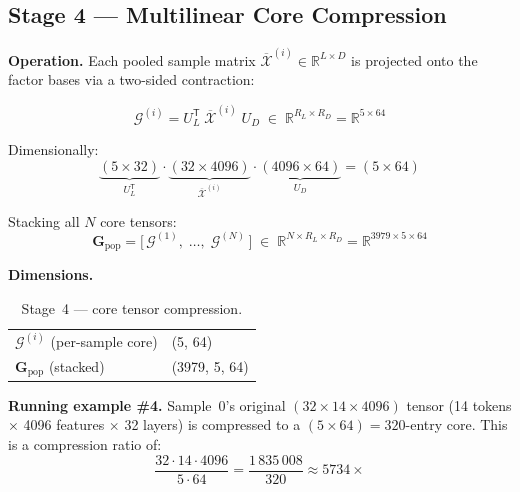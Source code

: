 \documentclass[11pt,a4paper]{article}
\begin{document}
\subsection{Stage 4 — Multilinear Core Compression}

\textbf{Operation.}
Each pooled sample matrix $\overline{\mathcal{X}}^{(i)} \in \mathbb{R}^{L \times D}$
is projected onto the factor bases via a two-sided contraction:

\[
\mathcal{G}^{(i)} = U_L^{\mathsf{T}} \;
                    \overline{\mathcal{X}}^{(i)} \;
                    U_D
                  \;\in\; \mathbb{R}^{R_L \times R_D}
                  = \mathbb{R}^{5 \times 64}
\]

Dimensionally:
\[
\underbrace{(5 \times 32)}_{U_L^{\mathsf{T}}}
\cdot
\underbrace{(32 \times 4096)}_{\overline{\mathcal{X}}^{(i)}}
\cdot
\underbrace{(4096 \times 64)}_{U_D}
=
(5 \times 64)
\]

Stacking all $N$ core tensors:
\[
\mathbf{G}_{\text{pop}} = \bigl[\,\mathcal{G}^{(1)},\; \dots,\;
                            \mathcal{G}^{(N)}\,\bigr]
                        \;\in\; \mathbb{R}^{N \times R_L \times R_D}
                        = \mathbb{R}^{3979 \times 5 \times 64}
\]

\noindent
\textbf{Dimensions.}

\begin{table}[H]
\centering
\begin{tabular}{>{\ttfamily}l>{\ttfamily}l}
\toprule
\multicolumn{1}{c}{\textbf{Tensor}} & \multicolumn{1}{c}{\textbf{Shape}} \\
\midrule
$\mathcal{G}^{(i)}$ (per-sample core) & (5, 64) \\
$\mathbf{G}_{\text{pop}}$ (stacked)   & (3979, 5, 64) \\
\bottomrule
\end{tabular}
\caption{Stage~4 — core tensor compression.}
\end{table}

\noindent
\textbf{Running example \#4.}
Sample~0's original $(32 \times 14 \times 4096)$ tensor (14 tokens $\times$ 4096
features $\times$ 32 layers) is compressed to a $(5 \times 64) = 320$-entry core.
This is a compression ratio of:
\[
\frac{32 \cdot 14 \cdot 4096}{5 \cdot 64}
= \frac{1\,835\,008}{320} \approx 5734\times
\]

\end{document}
